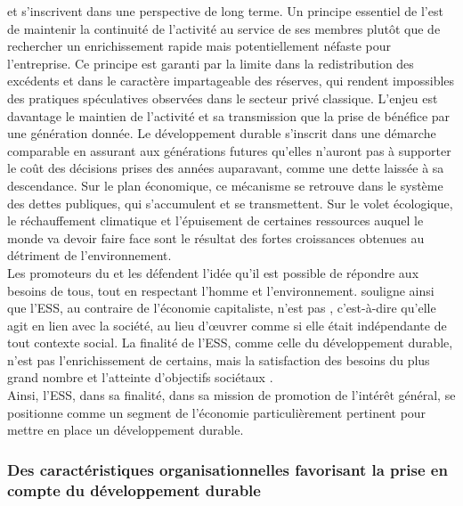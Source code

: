             \ess et \dd  s’inscrivent dans une perspective de long terme. Un principe essentiel de l’\ess est de maintenir la continuité de l’activité au service de ses membres plutôt que de rechercher un enrichissement rapide mais potentiellement néfaste pour l’entreprise. Ce principe est garanti par la limite dans la redistribution des excédents et dans le caractère impartageable des réserves, qui rendent impossibles des pratiques spéculatives observées dans le secteur privé classique. L’enjeu est davantage le maintien de l’activité et sa transmission que la prise de bénéfice par une génération donnée. Le développement durable s’inscrit dans une démarche comparable en assurant aux générations futures qu’elles n’auront pas à supporter le coût des décisions prises des années auparavant, comme une dette laissée à sa descendance. Sur le plan économique, ce mécanisme se retrouve dans le système des dettes publiques, qui s’accumulent et se transmettent. Sur le volet écologique, le réchauffement climatique et l’épuisement de certaines ressources auquel le monde va devoir faire face sont le résultat des fortes croissances obtenues au détriment de l’environnement. \\

            Les promoteurs du \dd et les \aess défendent l’idée qu’il est possible de répondre aux besoins de tous, tout en respectant l’homme et l’environnement. \textcite{cretieneau2010economie} souligne ainsi que l’ESS, au contraire de l’économie capitaliste, n’est pas , c'est-à-dire qu’elle agit en lien avec la société, au lieu d’œuvrer comme si elle était indépendante de tout contexte social. La finalité de l’ESS, comme celle du développement durable, n’est pas l’enrichissement de certains, mais la satisfaction des besoins du plus grand nombre et l’atteinte d’objectifs sociétaux \parencite{gendron2011developpement}. \\

            Ainsi, l’ESS, dans sa finalité, dans sa mission de promotion de l’intérêt général, se positionne comme un segment de l’économie particulièrement pertinent pour mettre en place un développement durable.

        \subsubsection{Des caractéristiques organisationnelles favorisant la prise en compte du développement durable}

